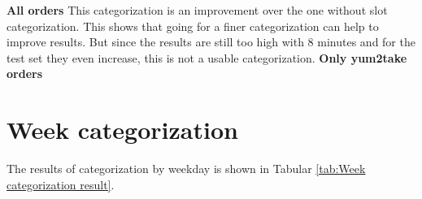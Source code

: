 \newline\newline\textbf{All orders}\newline
This categorization is an improvement over the one without slot categorization. This shows that going for a finer categorization can help to improve results. But since the results are still too high with 8 minutes and for the test set they even increase, this is not a usable categorization.
\newline\newline\textbf{Only yum2take orders}\newline
\section{Week categorization}\label{section:Week categorization}
The results of categorization by weekday is shown in Tabular \ref{tab:Week categorization result}.
\begin{table}[h]
\centering
\caption{Week categorization result}
\label{tab:Week categorization result}
\end{table}
